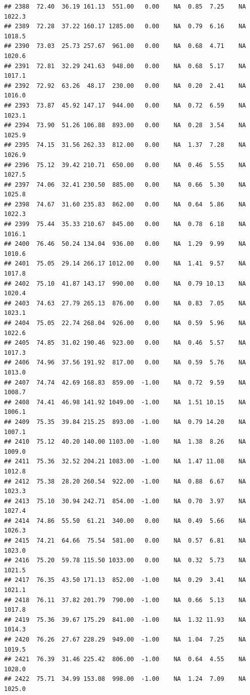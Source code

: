 \documentclass{article}\usepackage{graphicx, color}
\makeatletter
\newenvironment{kframe}{%
 \def\at@end@of@kframe{}%
 \ifinner\ifhmode%
  \def\at@end@of@kframe{\end{minipage}}%
  \begin{minipage}{\columnwidth}%
 \fi\fi%
 \def\FrameCommand##1{\hskip\@totalleftmargin \hskip-\fboxsep
 \colorbox{shadecolor}{##1}\hskip-\fboxsep
     \hskip-\linewidth \hskip-\@totalleftmargin \hskip\columnwidth}%
 \MakeFramed {\advance\hsize-\width
   \@totalleftmargin\z@ \linewidth\hsize
   \@setminipage}}%
 {\par\unskip\endMakeFramed%
 \at@end@of@kframe}
\newenvironment{knitrout}{}{} %
\makeatother
\begin{document}
\begin{knitrout}
\begin{kframe}
\begin{verbatim}
## 2388  72.40  36.19 161.13  551.00   0.00    NA  0.85  7.25    NA 1022.3
## 2389  72.28  37.22 160.17 1285.00   0.00    NA  0.79  6.16    NA 1018.5
## 2390  73.03  25.73 257.67  961.00   0.00    NA  0.68  4.71    NA 1020.6
## 2391  72.81  32.29 241.63  948.00   0.00    NA  0.68  5.17    NA 1017.1
## 2392  72.92  63.26  48.17  230.00   0.00    NA  0.20  2.41    NA 1016.0
## 2393  73.87  45.92 147.17  944.00   0.00    NA  0.72  6.59    NA 1023.1
## 2394  73.90  51.26 106.88  893.00   0.00    NA  0.28  3.54    NA 1025.9
## 2395  74.15  31.56 262.33  812.00   0.00    NA  1.37  7.28    NA 1026.9
## 2396  75.12  39.42 210.71  650.00   0.00    NA  0.46  5.55    NA 1027.5
## 2397  74.06  32.41 230.50  885.00   0.00    NA  0.66  5.30    NA 1025.8
## 2398  74.67  31.60 235.83  862.00   0.00    NA  0.64  5.86    NA 1022.3
## 2399  75.44  35.33 210.67  845.00   0.00    NA  0.78  6.18    NA 1016.1
## 2400  76.46  50.24 134.04  936.00   0.00    NA  1.29  9.99    NA 1010.6
## 2401  75.05  29.14 266.17 1012.00   0.00    NA  1.41  9.57    NA 1017.8
## 2402  75.10  41.87 143.17  990.00   0.00    NA  0.79 10.13    NA 1020.4
## 2403  74.63  27.79 265.13  876.00   0.00    NA  0.83  7.05    NA 1023.1
## 2404  75.05  22.74 268.04  926.00   0.00    NA  0.59  5.96    NA 1022.6
## 2405  74.85  31.02 190.46  923.00   0.00    NA  0.46  5.57    NA 1017.3
## 2406  74.96  37.56 191.92  817.00   0.00    NA  0.59  5.76    NA 1013.0
## 2407  74.74  42.69 168.83  859.00  -1.00    NA  0.72  9.59    NA 1008.7
## 2408  74.41  46.98 141.92 1049.00  -1.00    NA  1.51 10.15    NA 1006.1
## 2409  75.35  39.84 215.25  893.00  -1.00    NA  0.79 14.20    NA 1007.1
## 2410  75.12  40.20 140.00 1103.00  -1.00    NA  1.38  8.26    NA 1009.0
## 2411  75.36  32.52 204.21 1083.00  -1.00    NA  1.47 11.08    NA 1012.8
## 2412  75.38  28.20 260.54  922.00  -1.00    NA  0.88  6.67    NA 1023.3
## 2413  75.10  30.94 242.71  854.00  -1.00    NA  0.70  3.97    NA 1027.4
## 2414  74.86  55.50  61.21  340.00   0.00    NA  0.49  5.66    NA 1026.3
## 2415  74.21  64.66  75.54  581.00   0.00    NA  0.57  6.81    NA 1023.0
## 2416  75.20  59.78 115.50 1033.00   0.00    NA  0.32  5.73    NA 1021.5
## 2417  76.35  43.50 171.13  852.00  -1.00    NA  0.29  3.41    NA 1021.1
## 2418  76.11  37.82 201.79  790.00  -1.00    NA  0.66  5.13    NA 1017.8
## 2419  75.36  39.67 175.29  841.00  -1.00    NA  1.32 11.93    NA 1014.3
## 2420  76.26  27.67 228.29  949.00  -1.00    NA  1.04  7.25    NA 1019.5
## 2421  76.39  31.46 225.42  806.00  -1.00    NA  0.64  4.55    NA 1028.0
## 2422  75.71  34.99 153.08  998.00  -1.00    NA  1.24  7.09    NA 1025.0

\end{verbatim}
\end{kframe}
\end{knitrout}
\end{document}
